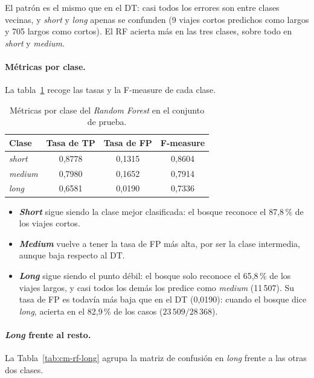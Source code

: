 \documentclass[12pt,a4paper]{article}
\begin{document}
El patrón es el mismo que en el \ac{DT}: casi todos los errores son entre
clases vecinas, y \textit{short} y \textit{long} apenas se confunden (9
viajes cortos predichos como largos y 705 largos como cortos). El \ac{RF}
acierta más en las tres clases, sobre todo en \textit{short} y
\textit{medium}.

\paragraph{Métricas por clase.} La tabla~\ref{tab:metricas-rf} recoge las
tasas y la F-measure de cada clase.

\begin{table}[H]
\centering
\small
\begin{tabular}{lccc}
\toprule
\textbf{Clase} & \textbf{Tasa de \acs{TP}} & \textbf{Tasa de \acs{FP}} & \textbf{F-measure} \\
\midrule
\textit{short}  & 0,8778 & 0,1315 & 0,8604 \\
\textit{medium} & 0,7980 & 0,1652 & 0,7914 \\
\textit{long}   & 0,6581 & 0,0190 & 0,7336 \\
\bottomrule
\end{tabular}
\caption{Métricas por clase del \textit{Random Forest} en el conjunto de
prueba.}
\label{tab:metricas-rf}
\end{table}

\begin{itemize}
    \item \textbf{\textit{Short}} sigue siendo la clase mejor clasificada:
    el bosque reconoce el 87,8\,\% de los viajes cortos.
    \item \textbf{\textit{Medium}} vuelve a tener la tasa de \acs{FP} más
    alta, por ser la clase intermedia, aunque baja respecto al \ac{DT}.
    \item \textbf{\textit{Long}} sigue siendo el punto débil: el bosque solo
    reconoce el 65,8\,\% de los viajes largos, y casi todos los demás los
    predice como \textit{medium} (11\,507). Su tasa de \acs{FP} es todavía
    más baja que en el \ac{DT} (0,0190): cuando el bosque dice
    \textit{long}, acierta en el 82,9\,\% de los casos
    ($23\,509 / 28\,368$).
\end{itemize}

\paragraph{\textit{Long} frente al resto.} La Tabla~\ref{tab:cm-rf-long}
agrupa la matriz de confusión en \textit{long} frente a las otras dos
clases.
\end{document}
